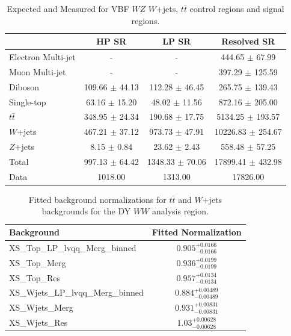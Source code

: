 \begin{table}
\begin{tabular}{|l|c|c|c|}
\hline
	  &	 HP SR &	 LP SR &	Resolved SR \\\hline 
	Electron Multi-jet &	- &	- &	444.65 $\pm$ 67.99 \\\hline 
	Muon Multi-jet &	- &	- &	397.29 $\pm$ 125.59 \\\hline 
	Diboson &	109.66 $\pm$ 44.13 &	112.28 $\pm$ 46.45 &	265.75 $\pm$ 139.43 \\\hline 
	Single-top &	63.16 $\pm$ 15.20 &	48.02 $\pm$ 11.56 &	872.16 $\pm$ 205.00 \\\hline 
	$t\bar{t}$ &	348.95 $\pm$ 24.34 &	190.68 $\pm$ 17.75 &	5134.25 $\pm$ 193.57 \\\hline 
	$W$+jets &	467.21 $\pm$ 37.12 &	973.73 $\pm$ 47.91 &	10226.83 $\pm$ 254.67 \\\hline 
	$Z$+jets &	8.15 $\pm$ 0.84 &	23.62 $\pm$ 2.43 &	558.48 $\pm$ 57.25 \\\hline 
	Total &	997.13 $\pm$ 64.42 &	1348.33 $\pm$ 70.06 &	17899.41 $\pm$ 432.98 \\\hline 
	Data &	1018.00 &	1313.00 &	17826.00 \\\hline 
\end{tabular}
\caption{Expected and Measured for VBF $WZ$ $W$+jets, $t\bar{t}$ control regions and signal regions.}
\label{tbl:hvtwzbf_yields_tcr}
\end{table}

\begin{table}
\begin{tabular}{|l|c|}
\hline
Background & Fitted Normalization \\\hline
XS\_Top\_LP\_lvqq\_Merg\_binned & $0.905^{+0.0166}_{-0.0166}$ \\\hline
XS\_Top\_Merg & $0.936^{+0.0199}_{-0.0199}$ \\\hline
XS\_Top\_Res & $0.957^{+0.0134}_{-0.0134}$ \\\hline
XS\_Wjets\_LP\_lvqq\_Merg\_binned & $0.884^{+0.00489}_{-0.00489}$ \\\hline
XS\_Wjets\_Merg & $0.931^{+0.00831}_{-0.00831}$ \\\hline
XS\_Wjets\_Res & $1.03^{+0.00628}_{-0.00628}$ \\\hline

\end{tabular}
\caption{Fitted background normalizations for $t\bar{t}$ and $W$+jets backgrounds for the DY $WW$ analysis region.}
\label{tbl:hvtww_norm}
\end{table}



